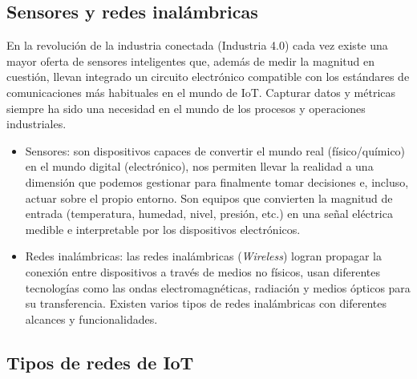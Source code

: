 \subsection{Sensores y redes inalámbricas}

En la revolución de la industria conectada (Industria 4.0) cada vez existe una mayor oferta de sensores inteligentes que, además de medir la magnitud en cuestión, llevan integrado un circuito electrónico compatible con los estándares de comunicaciones más habituales en el mundo de IoT. Capturar datos y métricas siempre ha sido una necesidad en el mundo de los procesos y operaciones industriales.

\begin{itemize}
\item Sensores: son dispositivos capaces de convertir el mundo real (físico/químico) en el mundo digital (electrónico), nos permiten llevar la realidad a una dimensión que podemos gestionar para finalmente tomar decisiones e, incluso, actuar sobre el propio entorno. Son equipos que convierten la magnitud de entrada (temperatura, humedad, nivel, presión, etc.) en una señal eléctrica medible e interpretable por los dispositivos electrónicos.

\item Redes inalámbricas: las redes inalámbricas (\emph{Wireless}) logran propagar la conexión entre dispositivos a través de medios no físicos, usan diferentes tecnologías como las ondas electromagnéticas, radiación y medios ópticos para su transferencia. Existen varios tipos de redes inalámbricas con diferentes alcances y funcionalidades.

\end{itemize}

\subsection{Tipos de redes de IoT}


